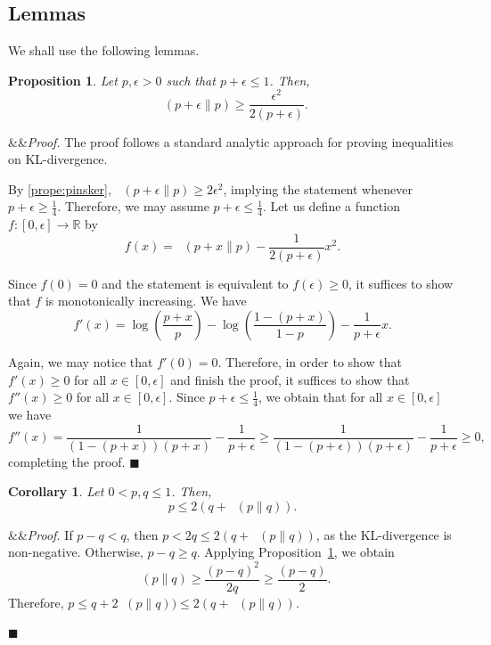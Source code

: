 \documentclass[11pt]{article}
\renewenvironment{proof}[1][]
    {\noindent
       \ifx&#1&{\it Proof.}
       \else{\it Proof ({#1}).}
       \fi}{\hfill $\blacksquare$}
\newtheorem{proposition}[theorem]{Proposition}
\newtheorem{corollary}[theorem]{Corollary}
\DeclareMathOperator{\KL}{D_{\text{KL}}}
\begin{document}
\subsection{Lemmas}

We shall use the following lemmas.

\begin{proposition} \label{prop:KL-analysis}
Let $p, \epsilon > 0$ such that $p + \epsilon \leq 1$. 
Then, $$\KL(p + \epsilon \| p) \geq \frac{\epsilon^2}{2(p + \epsilon)}.$$
\end{proposition}

\begin{proof}
The proof follows a standard analytic approach for proving inequalities on KL-divergence. 

By \ref{prope:pinsker}, $\KL(p + \epsilon \| p) \geq 2\epsilon^2$, 
implying the statement whenever $p+\epsilon \ge \frac{1}{4}$. Therefore, we may assume $p+\epsilon \le \frac{1}{4}$. Let us define a function $f:[0,\epsilon] \to \mathbb{R}$ by
\[
    f(x) = \KL(p + x \| p) - \frac{1}{2(p+\epsilon)}x^2.
\]

Since $f(0)=0$ and the statement is equivalent to $f(\epsilon) \ge 0$, it suffices to show that $f$ is monotonically increasing. We have
\[
    f'(x) = \log\left(\frac{p+x}{p}\right)-\log\left(\frac{1-(p+x)}{1-p}\right)-\frac{1}{p+\epsilon}x.
\]

Again, we may notice that $f'(0) = 0$. Therefore, in order to show that $f'(x) \ge 0$ for all $x \in [0,\epsilon]$ and finish the proof, it suffices to show that $f''(x) \ge 0$ for all $x \in [0,\epsilon]$. Since $p+\epsilon \le \frac{1}{4}$, we obtain that for all $x \in [0,\epsilon]$ we have
\[
    f''(x) = \frac{1}{(1-(p+x))(p+x)}-\frac{1}{p+\epsilon} \ge \frac{1}{(1-(p+\epsilon))(p+\epsilon)}-\frac{1}{p+\epsilon}\ge 0,
\]
completing the proof.
\end{proof}

\begin{corollary}
\label{cor:KL-analysis}
Let $0 < p, q \leq 1$. 
Then, $$p \leq 2(q +\KL(p \| q)).$$
\end{corollary}

\begin{proof}
If $p - q < q$, 
then $p < 2 q \leq 2(q + \KL(p \| q))$,
as the KL-divergence is non-negative. Otherwise, $p - q \ge q$.
Applying Proposition~\ref{prop:KL-analysis}, we obtain 
$$
\KL(p \| q) \geq \frac{(p - q)^2}{2q} \geq
\frac{(p - q)}{2}.
$$
Therefore, $p \leq q + 2\KL(p \| q)) \leq 2(q + \KL(p \| q))$.


\end{proof}
\end{document}
